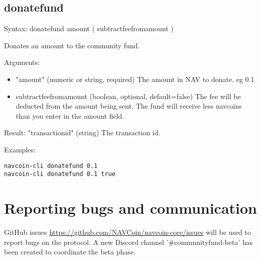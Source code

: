 \documentclass{artikel1}
\begin{document}
\begin{flushleft}
\subsection{donatefund}
Syntax: donatefund amount ( subtractfeefromamount )

Donates an amount to the community fund.

Arguments:
\begin{itemize}
\item "amount"      (numeric or string, required) The amount in NAV to donate. eg 0.1
\item subtractfeefromamount  (boolean, optional, default=false) The fee will be deducted from the amount being sent. The fund will receive less navcoins than you enter in the amount field.
\end{itemize}
Result:
"transactionid"  (string) The transaction id.

Examples:
\begin{lstlisting}
navcoin-cli donatefund 0.1
navcoin-cli donatefund 0.1 true
\end{lstlisting}
\section{Reporting bugs and communication}
GitHub issues \url{https://github.com/NAVCoin/navcoin-core/issues} will be used to report bugs on the protocol.
A new Discord channel '\#communityfund-beta' has been created to coordinate the beta phase.

\end{flushleft}
\end{document}
